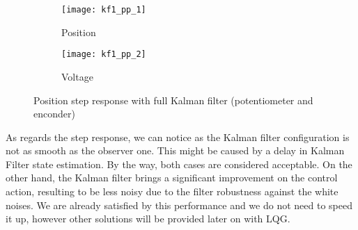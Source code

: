 \begin{figure*}[h]
	\centering
	\begin{subfigure}{0.45\columnwidth}
		\texttt{[image: kf1\_pp\_1]}
		\caption{Position}
	\end{subfigure}
	\begin{subfigure}{0.45\columnwidth}
		\texttt{[image: kf1\_pp\_2]}
		\caption{Voltage}
	\end{subfigure}
	\caption{Position step response with full Kalman filter (potentiometer and enconder)}
	\label{fig:Position step response with full Kalman Filter}
\end{figure*}

As regards the step response, we can notice as the Kalman filter configuration is not as smooth as the observer one. This might be caused by a delay in Kalman Filter state estimation. By the way, both cases are considered acceptable. On the other hand, the Kalman filter brings a significant improvement on the control action, resulting to be less noisy due to the filter robustness against the white noises.
We are already satisfied by this performance and we do not need to speed it up, however other solutions will be provided later on with LQG.

